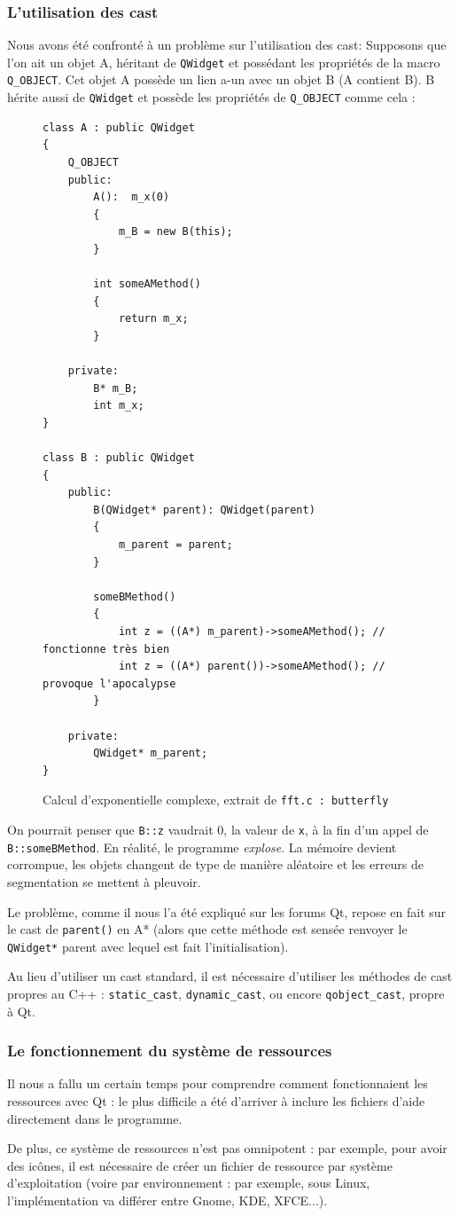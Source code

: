 \subsubsection{L'utilisation des cast}
Nous avons été confronté à un problème sur l'utilisation des cast:
Supposons que l'on ait un objet A, héritant de \texttt{QWidget} et possédant les propriétés de la macro \texttt{Q\_OBJECT}.
Cet objet A possède un lien a-un avec un objet B (A contient B).
B hérite aussi de \texttt{QWidget} et possède les propriétés de \texttt{Q\_OBJECT} comme cela :
\begin{figure}[H]
\begin{lstlisting}
class A : public QWidget
{
	Q_OBJECT
	public:
		A():  m_x(0)
		{
			m_B = new B(this);
		}

		int someAMethod()
		{
			return m_x;
		}

	private:
		B* m_B;
		int m_x;
}

class B : public QWidget
{
	public:
		B(QWidget* parent): QWidget(parent)
		{
			m_parent = parent;
		}

		someBMethod()
		{
			int z = ((A*) m_parent)->someAMethod(); // fonctionne très bien
			int z = ((A*) parent())->someAMethod(); // provoque l'apocalypse
		}

	private:
		QWidget* m_parent;
}
\end{lstlisting}
\caption{Calcul d'exponentielle complexe, extrait de \texttt{fft.c : butterfly}}
\label{api_cexp_computation}
\end{figure}

On pourrait penser que \texttt{B::z} vaudrait $0$, la valeur de \texttt{x}, à la fin d'un appel de \texttt{B::someBMethod}.
En réalité, le programme \textit{explose}. La mémoire devient corrompue, les objets
changent de type de manière aléatoire et les erreurs de segmentation se mettent à pleuvoir.

Le problème, comme il nous l'a été expliqué sur les forums Qt, repose en fait sur le cast de \texttt{parent()}
en A* (alors que cette méthode est sensée renvoyer le \texttt{QWidget*} parent avec lequel est fait l'initialisation).

Au lieu d'utiliser un cast standard, il est nécessaire d'utiliser les méthodes de cast propres au C++ :
\texttt{static\_cast}, \texttt{dynamic\_cast}, ou encore \texttt{qobject\_cast}, propre à Qt.

\subsubsection{Le fonctionnement du système de ressources}
Il nous a fallu un certain temps pour comprendre comment fonctionnaient les ressources avec Qt :
le plus difficile a été d'arriver à inclure les fichiers d'aide directement dans le programme.

De plus, ce système de ressources n'est pas omnipotent : par exemple, pour avoir des icônes, il est
nécessaire de créer un fichier de ressource par système d'exploitation (voire par environnement : par exemple,
sous Linux, l'implémentation va différer entre Gnome, KDE, XFCE...).

